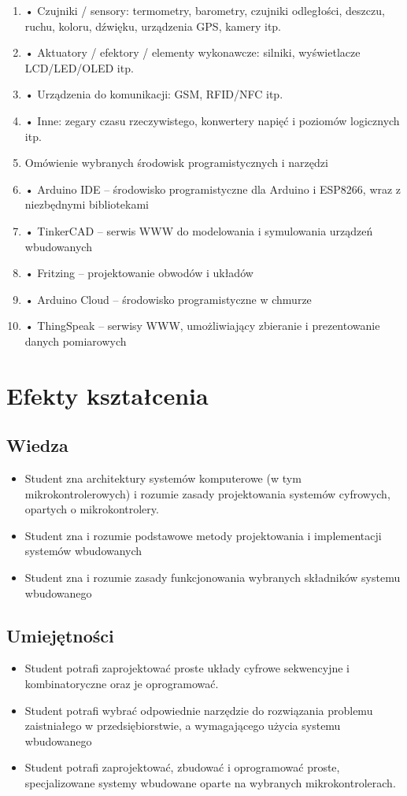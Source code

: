 \documentclass[12pt, a4paper]{article}
\begin{document}
\begin{enumerate}
  \item • Czujniki / sensory: termometry, barometry, czujniki odległości, deszczu, ruchu, koloru, dźwięku, urządzenia GPS, kamery itp.
  \item • Aktuatory / efektory / elementy wykonawcze: silniki, wyświetlacze LCD/LED/OLED itp.
  \item • Urządzenia do komunikacji: GSM, RFID/NFC itp.
  \item • Inne: zegary czasu rzeczywistego, konwertery napięć i poziomów logicznych itp.
  \item Omówienie wybranych środowisk programistycznych i narzędzi
  \item • Arduino IDE – środowisko programistyczne dla Arduino i ESP8266, wraz z niezbędnymi bibliotekami
  \item • TinkerCAD – serwis WWW do modelowania i symulowania urządzeń wbudowanych
  \item • Fritzing – projektowanie obwodów i układów
  \item • Arduino Cloud – środowisko programistyczne w chmurze
  \item • ThingSpeak – serwisy WWW, umożliwiający zbieranie i prezentowanie danych pomiarowych
\end{enumerate}

\section{Efekty kształcenia}

\subsection*{Wiedza}
\begin{itemize}
  \item Student zna architektury systemów komputerowe (w tym mikrokontrolerowych) i rozumie zasady projektowania systemów cyfrowych, opartych o mikrokontrolery.
  \item Student zna i rozumie podstawowe metody projektowania i implementacji systemów wbudowanych
  \item Student zna i rozumie zasady funkcjonowania wybranych składników systemu wbudowanego
\end{itemize}

\subsection*{Umiejętności}
\begin{itemize}
  \item Student potrafi zaprojektować proste układy cyfrowe sekwencyjne i kombinatoryczne oraz je oprogramować.
  \item Student potrafi  wybrać odpowiednie narzędzie do rozwiązania problemu zaistniałego w przedsiębiorstwie, a wymagającego użycia systemu wbudowanego
  \item Student potrafi zaprojektować, zbudować i oprogramować proste, specjalizowane systemy wbudowane oparte na wybranych mikrokontrolerach.
\end{itemize}
\end{document}
